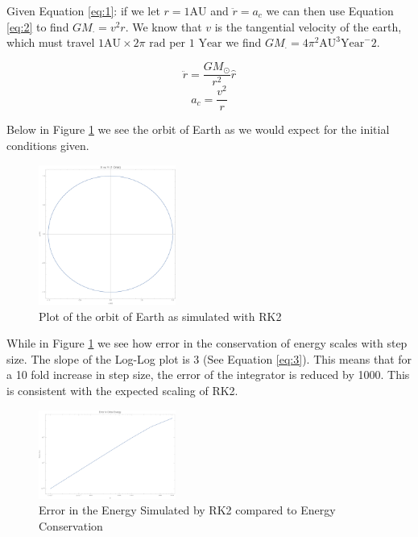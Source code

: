 \documentclass{article}
\begin{document}
\bigskip
{}
\medskip


Given Equation \ref{eq:1}: if we let 
$ r = 1 \text{AU} $ 
and 
$ \ddot{r} = a_c $
we can then use Equation \ref{eq:2} to find 
$ GM_{\cdot} = v^2r $.
We know that 
$ v $
is the tangential velocity of the earth, which must travel
$ 1 \text{AU} \times 2\pi \text{ rad} $
per 
$ 1 \text{ Year} $
we find 
$ GM_{\cdot} = 4\pi^2 \text{AU}^3\text{Year}^-2 $.

\begin{equation}\label{eq:1}
	\ddot{r} = \frac{GM_{\odot}}{r^2}\hat{r}
\end{equation}
\begin{equation}\label{eq:2}
	a_c = \frac{v^2}{r}
\end{equation}


\bigskip
{}
\medskip

Below in Figure \ref{fig:qual} we see the orbit of Earth as we would expect for the initial conditions given.

\begin{figure}[h]
	\begin{center}
		\includegraphics[width=0.4\textwidth]{qual.pdf}
	\end{center}
	\caption{Plot of the orbit of Earth as simulated with RK2}
\label{fig:qual}
\end{figure}

While in Figure \ref{fig:qual} we see how error in the conservation of energy scales with step size. The slope of the Log-Log plot is 3 (See Equation \ref{eq:3}).
This means that for a 10 fold increase in step size, the error of the integrator is reduced by 1000. This is consistent with the expected scaling of RK2.

\begin{figure}[h]
	\begin{center}
		\includegraphics[width=0.4\textwidth]{error.pdf}
	\end{center}
	\caption{Error in the Energy Simulated by RK2 compared to Energy Conservation}
\label{fig:error}
\end{figure}
\end{document}
